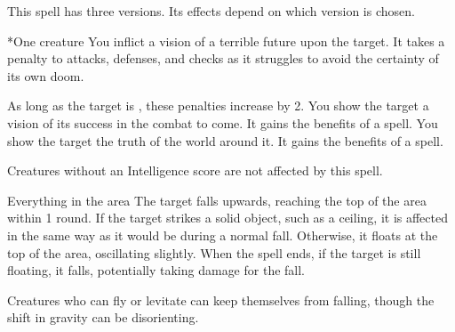 \begin{spellheader}
    \spellrng{\rngmed}
    \spelldur{\durshort}
\end{spellheader}
\begin{spelleffects}
    \spellspecial This spell has three versions. Its effects depend on which version is chosen.
    \begin{spelltarget}*{One creature}
         You inflict a vision of a terrible future upon the target. It takes a  penalty to attacks, defenses, and checks as it struggles to avoid the certainty of its own doom.

        As long as the target is \bloodied, these penalties increase by 2.
         You show the target a vision of its success in the combat to come. It gains the benefits of a  spell.
         You show the target the truth of the world around it. It gains the benefits of a  spell.
    \end{spelltarget}
\end{spelleffects}
\begin{spellfooter}
    \spellnotes Creatures without an Intelligence score are not affected by this spell.
\end{spellfooter}

\begin{spellheader}
\end{spellheader}
\begin{spelleffects}
    \begin{spelltarget}{Everything in the area}
        \spelleffect The target falls upwards, reaching the top of the area within 1 round. If the target strikes a solid object, such as a ceiling, it is affected in the same way as it would be during a normal fall. Otherwise, it floats at the top of the area, oscillating slightly. When the spell ends, if the target is still floating, it falls, potentially taking damage for the fall.
    \end{spelltarget}
\end{spelleffects}
\begin{spellfooter}
    \spellnotes Creatures who can fly or levitate can keep themselves from falling, though the shift in gravity can be disorienting.
\end{spellfooter}

